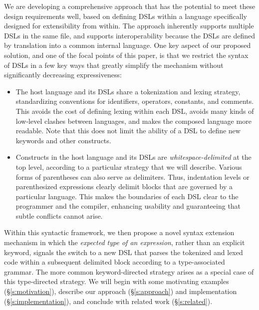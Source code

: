 We are developing a comprehensive approach that has the potential to meet these design requirements well, based on defining DSLs within a language specifically designed for extensibility from within.
The approach inherently supports multiple DSLs in the same file, and
supports interoperability because the DSLs are defined by translation
into a common internal language.  One key aspect of our proposed solution, and one of the focal points of this paper, is
that we restrict the syntax of DSLs in a few key ways that greatly simplify
the mechanism without significantly decreasing expressiveness:
\begin{itemize}

\item The host language and its DSLs share a tokenization and lexing 
  strategy, standardizing conventions for identifiers, operators,
  constants, and comments.  This avoids the cost of defining lexing
  within each DSL, avoids many kinds of low-level clashes between
  languages, and makes the composed language more readable. Note that this does not limit the ability of a DSL to define new keywords and other constructs.
 
\item Constructs in the host language and its DSLs are
  \emph{whitespace-delimited} at the top level, according to a particular strategy that we will describe.  Various forms of parentheses 
  can also serve as delimiters.  Thus, indentation levels or
  parenthesized expressions clearly delimit blocks that are governed by a particular 
  language.  This makes the boundaries of each DSL clear to
  the programmer and the compiler, enhancing usability and guaranteeing that 
  subtle conflicts cannot arise.
  
\end{itemize}

Within this syntactic framework, we then propose a novel syntax extension
mechanism in which the \emph{expected type of an expression}, rather than an explicit keyword, 
signals the switch to a new DSL that parses the tokenized and lexed code within a subsequent delimited block according to a type-associated grammar. The  more common keyword-directed strategy arises as a special case of this type-directed strategy. 
We will begin with some motivating examples (\S\ref{s:motivation}), describe our approach (\S\ref{s:approach}) and implementation (\S\ref{s:implementation}), and conclude with related work (\S\ref{s:related}).



